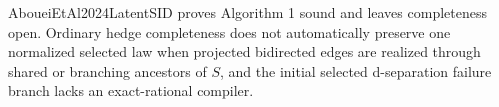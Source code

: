 AboueiEtAl2024LatentSID proves Algorithm 1 sound and leaves completeness open. Ordinary hedge completeness does not automatically preserve one normalized selected law when projected bidirected edges are realized through shared or branching ancestors of \(S\), and the initial selected d-separation failure branch lacks an exact-rational compiler.
